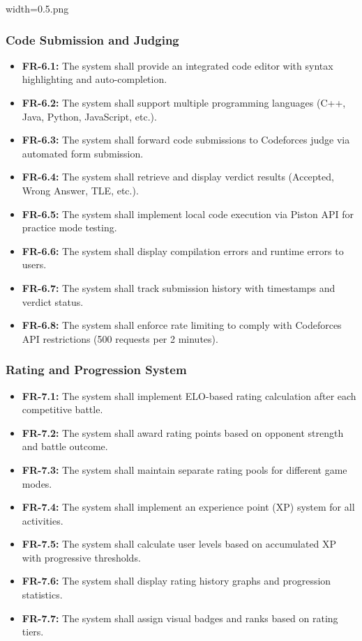 width=0.5\linewidthimage.png\documentclass[12pt,a4paper]{article}
\begin{document}
\subsubsection{Code Submission and Judging}
\begin{itemize}
\item \textbf{FR-6.1:} The system shall provide an integrated code editor with syntax highlighting and auto-completion.
\item \textbf{FR-6.2:} The system shall support multiple programming languages (C++, Java, Python, JavaScript, etc.).
\item \textbf{FR-6.3:} The system shall forward code submissions to Codeforces judge via automated form submission.
\item \textbf{FR-6.4:} The system shall retrieve and display verdict results (Accepted, Wrong Answer, TLE, etc.).
\item \textbf{FR-6.5:} The system shall implement local code execution via Piston API for practice mode testing.
\item \textbf{FR-6.6:} The system shall display compilation errors and runtime errors to users.
\item \textbf{FR-6.7:} The system shall track submission history with timestamps and verdict status.
\item \textbf{FR-6.8:} The system shall enforce rate limiting to comply with Codeforces API restrictions (500 requests per 2 minutes).
\end{itemize}

\subsubsection{Rating and Progression System}
\begin{itemize}
\item \textbf{FR-7.1:} The system shall implement ELO-based rating calculation after each competitive battle.
\item \textbf{FR-7.2:} The system shall award rating points based on opponent strength and battle outcome.
\item \textbf{FR-7.3:} The system shall maintain separate rating pools for different game modes.
\item \textbf{FR-7.4:} The system shall implement an experience point (XP) system for all activities.
\item \textbf{FR-7.5:} The system shall calculate user levels based on accumulated XP with progressive thresholds.
\item \textbf{FR-7.6:} The system shall display rating history graphs and progression statistics.
\item \textbf{FR-7.7:} The system shall assign visual badges and ranks based on rating tiers.
\end{itemize}
\end{document}
